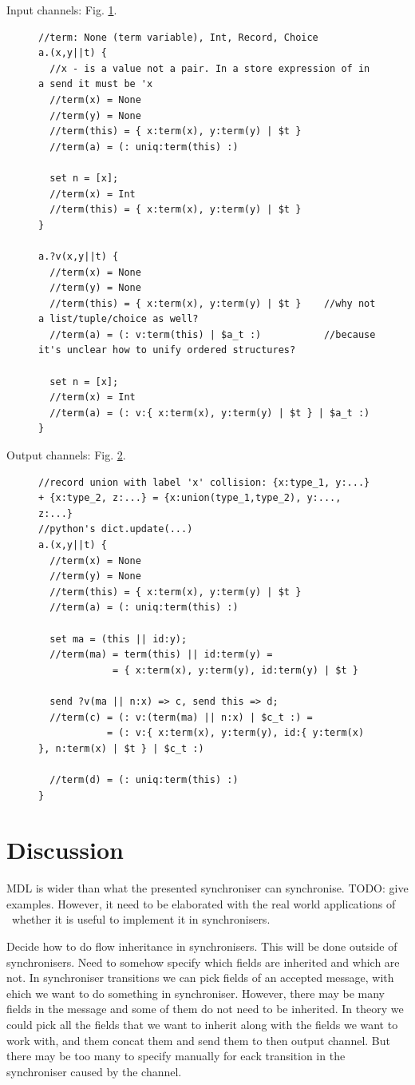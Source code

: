 Input channels: Fig. \ref{a}.
\begin{figure}[h!]
\begin{lstlisting}
//term: None (term variable), Int, Record, Choice
a.(x,y||t) {
  //x - is a value not a pair. In a store expression of in a send it must be 'x
  //term(x) = None
  //term(y) = None
  //term(this) = { x:term(x), y:term(y) | $t }
  //term(a) = (: uniq:term(this) :)

  set n = [x];
  //term(x) = Int
  //term(this) = { x:term(x), y:term(y) | $t }
}

a.?v(x,y||t) {
  //term(x) = None
  //term(y) = None
  //term(this) = { x:term(x), y:term(y) | $t }    //why not a list/tuple/choice as well?
  //term(a) = (: v:term(this) | $a_t :)           //because it's unclear how to unify ordered structures?

  set n = [x];
  //term(x) = Int
  //term(a) = (: v:{ x:term(x), y:term(y) | $t } | $a_t :)
}
\end{lstlisting}
\label{a}
\end{figure}

Output channels: Fig. \ref{b}.
\begin{figure}[h!]
\begin{lstlisting}[frame=single]
//record union with label 'x' collision: {x:type_1, y:...} + {x:type_2, z:...} = {x:union(type_1,type_2), y:..., z:...}
//python's dict.update(...)
a.(x,y||t) {
  //term(x) = None
  //term(y) = None
  //term(this) = { x:term(x), y:term(y) | $t }
  //term(a) = (: uniq:term(this) :)

  set ma = (this || id:y);
  //term(ma) = term(this) || id:term(y) =
             = { x:term(x), y:term(y), id:term(y) | $t }

  send ?v(ma || n:x) => c, send this => d;
  //term(c) = (: v:(term(ma) || n:x) | $c_t :) =
            = (: v:{ x:term(x), y:term(y), id:{ y:term(x) }, n:term(x) | $t } | $c_t :)

  //term(d) = (: uniq:term(this) :)
}
\end{lstlisting}
\label{b}
\end{figure}


\section{Discussion}
MDL is wider than what the presented synchroniser can synchronise. TODO: give examples. However, it need to be elaborated with the real world applications of \ak\ whether it is useful to implement it in synchronisers.

Decide how to do flow inheritance in synchronisers. This will be done outside of synchronisers. Need to somehow specify which fields are inherited and which are not. In synchroniser transitions we can pick fields of an accepted message, with ehich we want to do something in synchroniser. However, there may be many fields in the message and some of them do not need to be inherited. In theory we could pick all the fields that we want to inherit along with the fields we want to work with, and them concat them and send them to then output channel. But there may be too many to specify manually for eack transition in the synchroniser caused by the channel.
